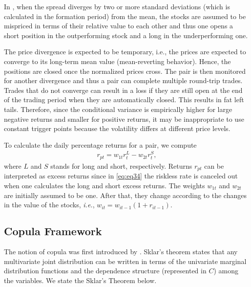 \documentclass[a4paper]{article}
\begin{document}
In \citet*{ggr06}, when the spread diverges by two or more standard deviations (which is calculated in the formation period) from the mean, the stocks are assumed to be mispriced in terms of their relative value to each other and thus one opens a short position in the outperforming stock and a long in the underperforming one. 

The price divergence is expected to be temporary, i.e., the prices are expected to converge to its long-term mean value (mean-reverting behavior). Hence, the positions are closed once the normalized prices cross. The pair is then monitored for another divergence and thus a pair can complete multiple round-trip trades. Trades that do not converge can result in a loss if they are still open at the end of the trading period when they are automatically closed. This results in fat left tails. Therefore, since the conditional variance is empirically higher for large negative returns and smaller for positive returns, it may be inappropriate to use constant trigger points because the volatility differs at different price levels.

To calculate the daily percentage returns for a pair, we compute%
	\begin{equation}
	\begin{aligned}
	r_{pt}=w_{1t}r_{t}^{L}-w_{2t}r_{t}^{S},
	\end{aligned}
	\label{eq:eq34}
	\end{equation}
	where $L$ and $S$ stands for long and short, respectively. Returns $r_{pt}$ can be interpreted as excess returns since in \eqref{eq:eq34} the riskless rate is canceled out when one calculates the long and short excess returns. The weights $w_{1t}$ and $w_{2t}$ are initially assumed to be one. After that, they change according to the changes in the value of the stocks, \emph{i.e.}, $w_{it}=w_{it-1}(1+r_{it-1})$.
	
	\vspace{0.6cm}
	
	\subsection{Copula Framework}
	
	The notion of copula was first introduced by \citet*{sklar1959}. Sklar's theorem states that any multivariate joint distribution can be written in terms of the univariate marginal distribution functions and the dependence structure (represented in $C$) among the variables. We state the Sklar's Theorem below.
	
\end{document}
